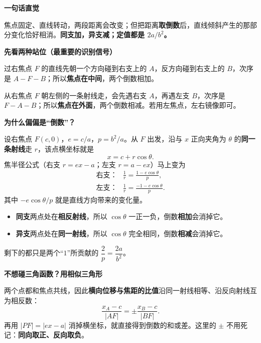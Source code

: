 \begin{explanationbox}
  \textbf{\textcolor{CExplanation}{一句话直觉}}

  焦点固定、直线转动，两段距离会改变；但把距离\textbf{取倒数}后，直线倾斜产生的那部分变化恰好相消。\textbf{同支加，异支减；定值都是 $2a/b^2$。}

  \medskip
  \textbf{\textcolor{CExplanation}{先看两种站位（最重要的识别信号）}}
  \begin{description}[style=nextline,leftmargin=2.8em,labelsep=0.5em,itemsep=0.4em]
    \item[\textbf{同支：}] 过右焦点 $F$ 的直线先朝一个方向碰到右支上的 $A$，反方向碰到右支上的 $B$，次序是 $A-F-B$；所以\textbf{焦点在中间}，两个倒数相加。
    \item[\textbf{异支：}] 从右焦点 $F$ 朝左侧的一条射线走，会先遇右支 $A$，再遇左支 $B$，次序是 $F-A-B$；所以\textbf{焦点在外面}，两个倒数相减。若用左焦点，左右镜像即可。
  \end{description}

  \medskip
  \textbf{\textcolor{CExplanation}{为什么偏偏是“倒数”？}}

  设右焦点 $F(c,0)$，$e=c/a$，$p=b^2/a$。从 $F$ 出发，沿与 $x$ 正向夹角为 $\theta$ 的\textbf{同一条射线}走 $r$，该点横坐标就是
  \[
    x=c+r\cos\theta.
  \]
  焦半径公式（右支 $r=ex-a$；左支 $r=a-ex$）马上变为
  \[
    \begin{array}{ll}
      \text{右支：}&\displaystyle\frac1r=\frac{1-e\cos\theta}{p},\\[4pt]
      \text{左支：}&\displaystyle\frac1r=\frac{-1-e\cos\theta}{p}.
    \end{array}
  \]
  其中 $-e\cos\theta/p$ 就是直线方向带来的变化量。
  \begin{itemize}[leftmargin=*,itemsep=0.35em,topsep=0.3em]
    \item \textbf{同支}两点处在\textbf{相反射线}，所以 $\cos\theta$ 一正一负，倒数\textbf{相加}会消掉它。
    \item \textbf{异支}两点处在\textbf{同一射线}，所以 $\cos\theta$ 完全相同，倒数\textbf{相减}会消掉它。
  \end{itemize}
  剩下的都只是两个“$1$”所贡献的 $\dfrac2p=\dfrac{2a}{b^2}$。

  \medskip
  \textbf{\textcolor{CExplanation}{不想碰三角函数？用相似三角形}}

  两个点都和焦点共线，因此\textbf{横向位移与焦距的比值}沿同一射线相等、沿反向射线互为相反数：
  \[
    \frac{x_A-c}{|AF|}=\pm\frac{x_B-c}{|BF|}.
  \]
  再用 $|PF|=|ex-a|$ 消掉横坐标，就直接得到倒数的和或差。这里的 $\pm$ 不用死记：\textbf{同向取正、反向取负}。


\end{explanationbox}
